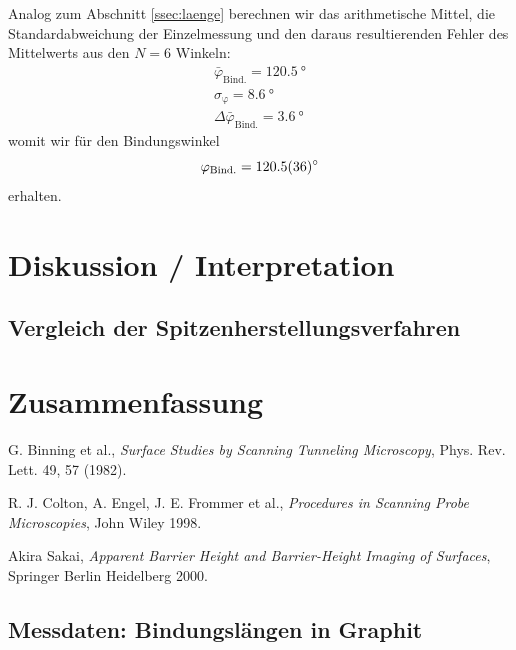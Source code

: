 \documentclass[10pt, a4paper]{article}
\begin{document}


Analog zum Abschnitt \ref{ssec:laenge} berechnen wir das arithmetische Mittel, die Standardabweichung der Einzelmessung und den daraus resultierenden Fehler des Mittelwerts aus den $N = 6$ Winkeln:
\begin{align}
  \bar{\varphi}_\mathrm{Bind.} = \SI{120,5}{\degree} \\
  \sigma_\mathrm{\varphi} = \SI{8,6}{\degree} \\
  \Delta \bar{\varphi}_\mathrm{Bind.} = \SI{3,6}{\degree}
\end{align}
womit wir für den Bindungswinkel
\begin{equation}
  \varphi_\mathrm{Bind.} = \SI{120,5 +- 3,6}{\degree}
\end{equation}
erhalten.

\section{Diskussion / Interpretation}
\label{sec:Diskussion}

\subsection{Vergleich der Spitzenherstellungsverfahren}

\section{Zusammenfassung}


\begin{thebibliography}{9}

  G. Binning et al.,
  \emph{Surface Studies by Scanning Tunneling Microscopy},
  Phys. Rev. Lett. 49, 57 (1982).

  R. J. Colton, A. Engel, J. E. Frommer et al.,
  \emph{Procedures in Scanning Probe Microscopies},
  John Wiley 1998.

  Akira Sakai,
  \emph{Apparent Barrier Height and Barrier-Height Imaging of Surfaces},
  Springer Berlin Heidelberg 2000.
  
\end{thebibliography}

\newpage

\begin{appendix}
\section{Messdaten: Bindungslängen in Graphit}
\label{messw:laenge}


\end{appendix}
\end{document}
